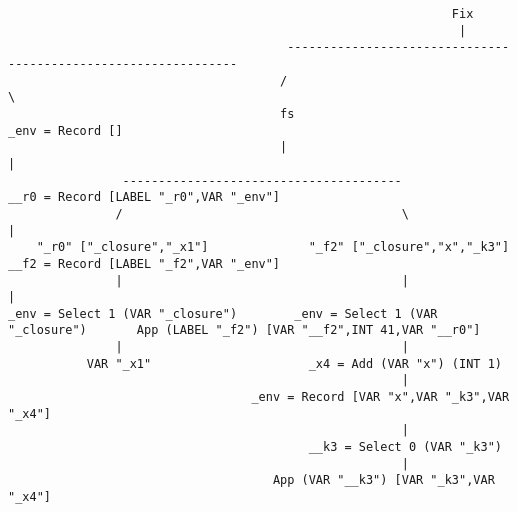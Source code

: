 \begin{landscape}
\begin{lstlisting}
                                                              Fix
                                                               |
                                       ---------------------------------------------------------------
                                      /                                                               \
                                      fs                                                       _env = Record []
                                      |                                                               |
                ---------------------------------------                             __r0 = Record [LABEL "_r0",VAR "_env"]
               /                                       \                                              |
    "_r0" ["_closure","_x1"]              "_f2" ["_closure","x","_k3"]              __f2 = Record [LABEL "_f2",VAR "_env"]
               |                                       |                                              |
_env = Select 1 (VAR "_closure")        _env = Select 1 (VAR "_closure")       App (LABEL "_f2") [VAR "__f2",INT 41,VAR "__r0"]
               |                                       |
           VAR "_x1"                      _x4 = Add (VAR "x") (INT 1)
                                                       |
                                  _env = Record [VAR "x",VAR "_k3",VAR "_x4"]
                                                       |
                                          __k3 = Select 0 (VAR "_k3")
                                                       |
                                     App (VAR "__k3") [VAR "_k3",VAR "_x4"]

\end{lstlisting}
\end{landscape}
\clearpage


